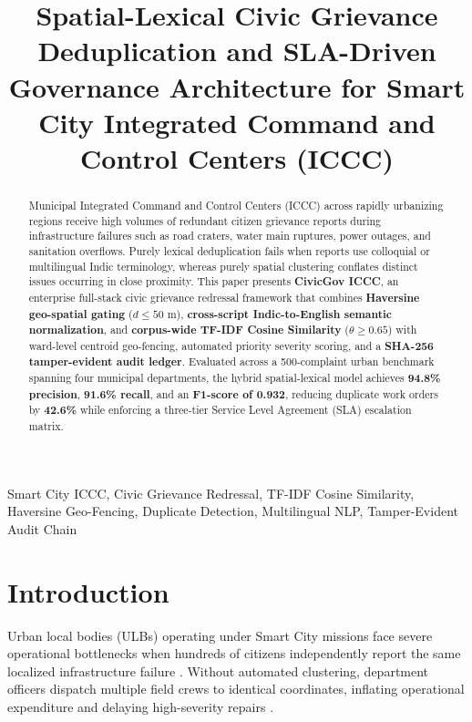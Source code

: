 \documentclass[conference]{IEEEtran}
\begin{document}
\title{Spatial-Lexical Civic Grievance Deduplication and SLA-Driven Governance Architecture for Smart City Integrated Command and Control Centers (ICCC)}

\author{
}

\maketitle

\begin{abstract}
Municipal Integrated Command and Control Centers (ICCC) across rapidly urbanizing regions receive high volumes of redundant citizen grievance reports during infrastructure failures such as road craters, water main ruptures, power outages, and sanitation overflows. Purely lexical deduplication fails when reports use colloquial or multilingual Indic terminology, whereas purely spatial clustering conflates distinct issues occurring in close proximity. This paper presents \textbf{CivicGov ICCC}, an enterprise full-stack civic grievance redressal framework that combines \textbf{Haversine geo-spatial gating} ($d \le 50\text{ m}$), \textbf{cross-script Indic-to-English semantic normalization}, and \textbf{corpus-wide TF-IDF Cosine Similarity} ($\theta \ge 0.65$) with ward-level centroid geo-fencing, automated priority severity scoring, and a \textbf{SHA-256 tamper-evident audit ledger}. Evaluated across a 500-complaint urban benchmark spanning four municipal departments, the hybrid spatial-lexical model achieves \textbf{94.8\% precision}, \textbf{91.6\% recall}, and an \textbf{F1-score of 0.932}, reducing duplicate work orders by \textbf{42.6\%} while enforcing a three-tier Service Level Agreement (SLA) escalation matrix.
\end{abstract}

\begin{IEEEkeywords}
Smart City ICCC, Civic Grievance Redressal, TF-IDF Cosine Similarity, Haversine Geo-Fencing, Duplicate Detection, Multilingual NLP, Tamper-Evident Audit Chain
\end{IEEEkeywords}

\section{Introduction}
Urban local bodies (ULBs) operating under Smart City missions face severe operational bottlenecks when hundreds of citizens independently report the same localized infrastructure failure \cite{mohua2022iccc}. Without automated clustering, department officers dispatch multiple field crews to identical coordinates, inflating operational expenditure and delaying high-severity repairs \cite{kakkar2021automated}.
\end{document}
